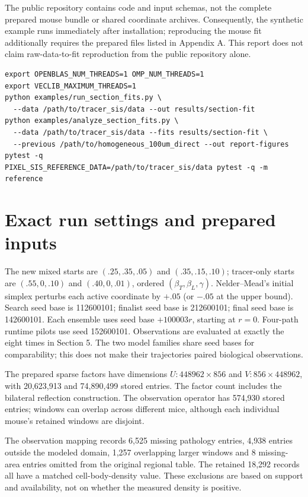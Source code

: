 \documentclass[10pt]{article}
\begin{document}
The public repository contains code and input schemas, not the complete prepared mouse bundle or shared coordinate archives. Consequently, the synthetic example runs immediately after installation; reproducing the mouse fit additionally requires the prepared files listed in Appendix A. This report does not claim raw-data-to-fit reproduction from the public repository alone.

\small\begin{verbatim}
export OPENBLAS_NUM_THREADS=1 OMP_NUM_THREADS=1
export VECLIB_MAXIMUM_THREADS=1
python examples/run_section_fits.py \
  --data /path/to/tracer_sis/data --out results/section-fit
python examples/analyze_section_fits.py \
  --data /path/to/tracer_sis/data --fits results/section-fit \
  --previous /path/to/homogeneous_100um_direct --out report-figures
pytest -q
PIXEL_SIS_REFERENCE_DATA=/path/to/tracer_sis/data pytest -q -m reference
\end{verbatim}\normalsize

\newpage
\appendix
\small\setlength{\parskip}{3pt}
\section{Exact run settings and prepared inputs}
The new mixed starts are $(.25,.35,.05)$ and $(.35,.15,.10)$; tracer-only starts are $(.55,0,.10)$ and $(.40,0,.01)$, ordered $(\beta_T,\beta_L,\gamma)$. Nelder--Mead's initial simplex perturbs each active coordinate by $+.05$ (or $-.05$ at the upper bound). Search seed base is 112600101; finalist seed base is 212600101; final seed base is 142600101. Each ensemble uses seed base $+100003r$, starting at $r=0$. Four-path runtime pilots use seed 152600101. Observations are evaluated at exactly the eight times in Section 5. The two model families share seed bases for comparability; this does not make their trajectories paired biological observations.

The prepared sparse factors have dimensions $U:448962\times856$ and $V:856\times448962$, with 20,623,913 and 74,890,499 stored entries. The factor count includes the bilateral reflection construction. The observation operator has 574,930 stored entries; windows can overlap across different mice, although each individual mouse's retained windows are disjoint.

The observation mapping records 6,525 missing pathology entries, 4,938 entries outside the modeled domain, 1,257 overlapping larger windows and 8 missing-area entries omitted from the original regional table. The retained 18,292 records all have a matched cell-body-density value. These exclusions are based on support and availability, not on whether the measured density is positive.
\end{document}
